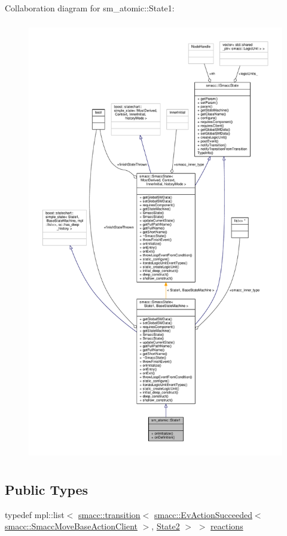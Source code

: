 Collaboration diagram for sm\+\_\+atomic\+:\+:State1\+:
\nopagebreak
\begin{figure}[H]
\begin{center}
\leavevmode
\includegraphics[height=550pt]{structsm__atomic_1_1State1__coll__graph}
\end{center}
\end{figure}
\subsection*{Public Types}
\begin{DoxyCompactItemize}
\item 
typedef mpl\+::list$<$ \hyperlink{classsmacc_1_1transition}{smacc\+::transition}$<$ \hyperlink{structsmacc_1_1EvActionSucceeded}{smacc\+::\+Ev\+Action\+Succeeded}$<$ \hyperlink{classsmacc_1_1SmaccMoveBaseActionClient}{smacc\+::\+Smacc\+Move\+Base\+Action\+Client} $>$, \hyperlink{structsm__atomic_1_1State2}{State2} $>$ $>$ \hyperlink{structsm__atomic_1_1State1_a4e99eb2cb5d658e8a174a51ce76a09c2}{reactions}
\end{DoxyCompactItemize}
